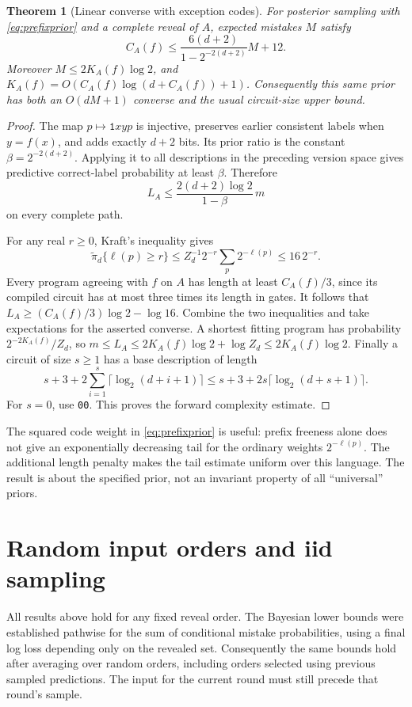 \documentclass[11pt]{article}
\newtheorem{theorem}{Theorem}
\newcommand{\1}{\mathbf 1}
\begin{document}
\begin{theorem}[Linear converse with exception codes]\label{thm:prefix}
For posterior sampling with \eqref{eq:prefixprior} and a complete reveal
of $A$, expected mistakes $M$ satisfy
\[
 C_A(f)\le
 \frac{6(d+2)}{1-2^{-2(d+2)}}M+12.
\]
Moreover $M\le2K_A(f)\log2$, and
$K_A(f)=O(C_A(f)\log(d+C_A(f))+1)$. Consequently this same prior has
both an $O(dM+1)$ converse and the usual circuit-size upper bound.
\end{theorem}
\begin{proof}
The map $p\mapsto\texttt{1}xyp$ is injective, preserves earlier consistent
labels when $y=f(x)$, and adds exactly $d+2$ bits. Its prior ratio is
the constant $\beta=2^{-2(d+2)}$. Applying it to all descriptions in
the preceding version space gives predictive correct-label probability
at least $\beta$. Therefore
\[
 L_A\le\frac{2(d+2)\log2}{1-\beta}\,m
\]
on every complete path.

For any real $r\ge0$, Kraft's inequality gives
\[
 \widetilde\pi_d\{\ell(p)\ge r\}
 \le Z_d^{-1}2^{-r}\sum_p2^{-\ell(p)}\le16\,2^{-r}.
\]
Every program agreeing with $f$ on $A$ has length at least $C_A(f)/3$,
since its compiled circuit has at most three times its length in gates.
It follows that
$L_A\ge(C_A(f)/3)\log2-\log16$. Combine the two inequalities and
take expectations for the asserted converse. A shortest fitting program
has probability $2^{-2K_A(f)}/Z_d$, so
$m\le L_A\le2K_A(f)\log2+\log Z_d\le2K_A(f)\log2$.
Finally a circuit of size $s\ge1$ has a base description of length
\[
 s+3+2\sum_{i=1}^s\lceil\log_2(d+i+1)\rceil
 \le s+3+2s\lceil\log_2(d+s+1)\rceil.
\]
For $s=0$, use \texttt{00}. This proves the forward complexity estimate.
\end{proof}

The squared code weight in \eqref{eq:prefixprior} is useful: prefix
freeness alone does not give an exponentially decreasing tail for the
ordinary weights $2^{-\ell(p)}$. The additional length penalty makes
the tail estimate uniform over this language. The result is about the
specified prior, not an invariant property of all ``universal'' priors.

\section{Random input orders and iid sampling}

All results above hold for any fixed reveal order. The Bayesian lower
bounds were established pathwise for the sum of conditional mistake
probabilities, using a final log loss depending only on the revealed
set. Consequently the same bounds hold after averaging over random
orders, including orders selected using previous sampled predictions.
The input for the current round must still precede that round's sample.
\end{document}

